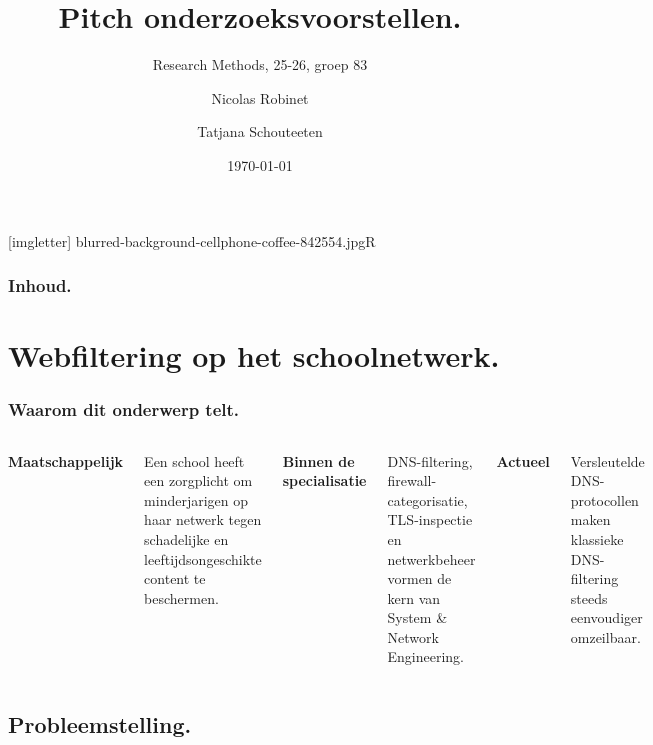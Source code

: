 \documentclass[aspectratio=169]{beamer}
\title{Pitch onderzoeksvoorstellen.}
\subtitle{Research Methods, 25-26, groep 83}
\author{Nicolas Robinet \and Tatjana Schouteeten}
\date{\today}
\begin{document}
{
    [imgletter]
        {blurred-background-cellphone-coffee-842554.jpg}{R}

    \begin{frame}
        \maketitle
    \end{frame}
}

\begin{frame}
    \frametitle{Inhoud.}

    \tableofcontents
\end{frame}

\section{Webfiltering op het schoolnetwerk.}

\begin{frame}
    \frametitle{Waarom dit onderwerp telt.}

    \begin{columns}[t]
        \textbf{Maatschappelijk}

        \medskip
        Een school heeft een zorgplicht om minderjarigen op haar netwerk
        tegen schadelijke en leeftijdsongeschikte content te beschermen.

        \textbf{Binnen de specialisatie}

        \medskip
        DNS-filtering, firewall-categorisatie, TLS-inspectie en
        netwerkbeheer vormen de kern van System \& Network Engineering.

        \textbf{Actueel}

        \medskip
        Versleutelde DNS-protocollen maken klassieke DNS-filtering steeds
        eenvoudiger omzeilbaar.
    \end{columns}
\end{frame}

\subsection{Probleemstelling.}
\end{document}
